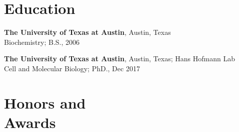 \documentclass[margin,line]{resume}
\begin{document}
\pagestyle{plain}

\begin{resume}




    \section{\mysidestyle Education} 

\begin{description}[leftmargin=0pt] 
\setlength{\itemsep}{4pt}
\item[] {\bf The University of Texas at Austin}, Austin, Texas \\Biochemistry; B.S., 2006
\item[] {\bf The University of Texas at Austin}, Austin, Texas; Hans Hofmann Lab
\\Cell and Molecular Biology; PhD., Dec 2017
\end{description}
    
    \section{\mysidestyle Honors and\\Awards} 


\end{resume}
\end{document}
